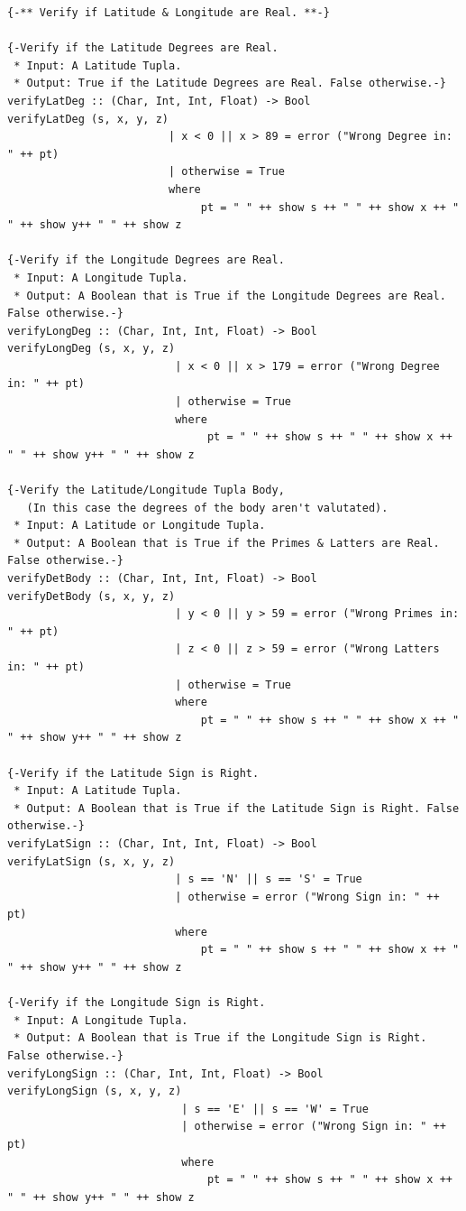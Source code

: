 \documentclass{article}
\begin{document}
\begin{lstlisting}
{-** Verify if Latitude & Longitude are Real. **-}

{-Verify if the Latitude Degrees are Real.
 * Input: A Latitude Tupla.
 * Output: True if the Latitude Degrees are Real. False otherwise.-}
verifyLatDeg :: (Char, Int, Int, Float) -> Bool 
verifyLatDeg (s, x, y, z)
                         | x < 0 || x > 89 = error ("Wrong Degree in: " ++ pt)
                         | otherwise = True
                         where
                              pt = " " ++ show s ++ " " ++ show x ++ " " ++ show y++ " " ++ show z

{-Verify if the Longitude Degrees are Real.
 * Input: A Longitude Tupla.
 * Output: A Boolean that is True if the Longitude Degrees are Real. False otherwise.-}
verifyLongDeg :: (Char, Int, Int, Float) -> Bool 
verifyLongDeg (s, x, y, z)
                          | x < 0 || x > 179 = error ("Wrong Degree in: " ++ pt)
                          | otherwise = True
                          where
                               pt = " " ++ show s ++ " " ++ show x ++ " " ++ show y++ " " ++ show z

{-Verify the Latitude/Longitude Tupla Body,
   (In this case the degrees of the body aren't valutated).
 * Input: A Latitude or Longitude Tupla.
 * Output: A Boolean that is True if the Primes & Latters are Real. False otherwise.-}
verifyDetBody :: (Char, Int, Int, Float) -> Bool
verifyDetBody (s, x, y, z)
                          | y < 0 || y > 59 = error ("Wrong Primes in: " ++ pt)
                          | z < 0 || z > 59 = error ("Wrong Latters in: " ++ pt)
                          | otherwise = True 
                          where
                              pt = " " ++ show s ++ " " ++ show x ++ " " ++ show y++ " " ++ show z

{-Verify if the Latitude Sign is Right.
 * Input: A Latitude Tupla.
 * Output: A Boolean that is True if the Latitude Sign is Right. False otherwise.-}
verifyLatSign :: (Char, Int, Int, Float) -> Bool 
verifyLatSign (s, x, y, z)
                          | s == 'N' || s == 'S' = True
                          | otherwise = error ("Wrong Sign in: " ++ pt)
                          where 
                              pt = " " ++ show s ++ " " ++ show x ++ " " ++ show y++ " " ++ show z

{-Verify if the Longitude Sign is Right.
 * Input: A Longitude Tupla.
 * Output: A Boolean that is True if the Longitude Sign is Right. False otherwise.-}
verifyLongSign :: (Char, Int, Int, Float) -> Bool 
verifyLongSign (s, x, y, z)
                           | s == 'E' || s == 'W' = True
                           | otherwise = error ("Wrong Sign in: " ++ pt)
                           where 
                               pt = " " ++ show s ++ " " ++ show x ++ " " ++ show y++ " " ++ show z


\end{lstlisting}
\end{document}
